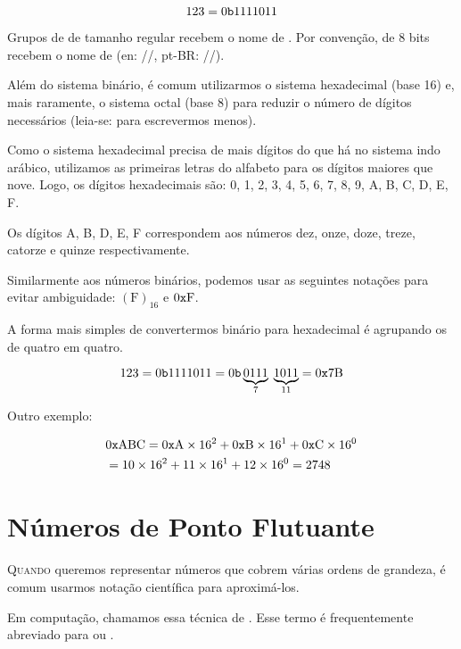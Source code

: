 \documentclass[
	12pt,				%
	openright,			%
	twoside,			%
	a4paper,			%
	english,			%
	french,				%
	brazil,				%
	sumario=tradicional
]{abntex2}
\begin{document}
\[
	123 = 0\texttt{b}1111011
\]

Grupos de  de tamanho regular recebem o nome de . Por convenção,  de 8 bits recebem o nome de  (en: //, pt-BR: //).

Além do sistema binário, é comum utilizarmos o sistema hexadecimal (base 16) e, mais raramente, o sistema octal (base 8) para reduzir o número de dígitos necessários (leia-se: para escrevermos menos).

Como o sistema hexadecimal precisa de mais dígitos do que há no sistema indo arábico, utilizamos as primeiras letras do alfabeto para os dígitos maiores que nove. Logo, os dígitos hexadecimais são: 0, 1, 2, 3, 4, 5, 6, 7, 8, 9, A, B, C, D, E, F.

Os dígitos A, B, D, E, F correspondem aos números dez, onze, doze, treze, catorze e quinze respectivamente.

Similarmente aos números binários, podemos usar as seguintes notações para evitar ambiguidade: $(\mathrm{F})_{16}$ e $0\texttt{x}\mathrm{F}$.

A forma mais simples de convertermos binário para hexadecimal é agrupando os  de quatro em quatro.

\[
	123 = 0\texttt{b}1111011 = 0\texttt{b}\underbrace{0111}_{7}\;\underbrace{1011}_{11} = 0\texttt{x}\mathrm{7B}
\]

Outro exemplo:

\begin{align*}
	&0\texttt{x}\mathrm{ABC} = 0\texttt{x}\mathrm{A}\times16^2 + 0\texttt{x}\mathrm{B}\times16^1 + 0\texttt{x}\mathrm{C}\times16^0 \\
	&= 10\times16^2 + 11\times16^1 + 12\times16^0 = 2748
\end{align*}

\section{Números de Ponto Flutuante}

\lettrine[nindent=0.35em,lhang=0.40,loversize=0.3]{Q}{uando}
queremos representar números que cobrem várias ordens de grandeza, é comum usarmos notação científica para aproximá-los.

Em computação, chamamos essa técnica de . Esse termo é frequentemente abreviado para  ou .

\end{document}
